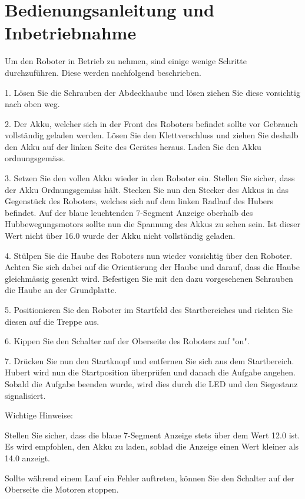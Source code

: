 \newpage

\section{Bedienungsanleitung und Inbetriebnahme}

Um den Roboter in Betrieb zu nehmen, sind einige wenige Schritte durchzuführen. Diese werden nachfolgend beschrieben.

1. Lösen Sie die Schrauben der Abdeckhaube und lösen ziehen Sie diese vorsichtig nach oben weg.

2. Der Akku, welcher sich in der Front des Roboters befindet sollte vor Gebrauch vollständig geladen werden. Lösen Sie den Klettverschluss und ziehen Sie deshalb den Akku auf der linken Seite des Gerätes heraus. Laden Sie den Akku ordnungsgemäss.

3. Setzen Sie den vollen Akku wieder in den Roboter ein. Stellen Sie sicher, dass der Akku Ordnungsgemäss hält. Stecken Sie nun den Stecker des Akkus in das Gegenstück des Roboters, welches sich auf dem linken Radlauf des Hubers befindet. Auf der blaue leuchtenden 7-Segment Anzeige oberhalb des Hubbewegungsmotors sollte nun die Spannung des Akkus zu sehen sein. Ist dieser Wert nicht über 16.0 wurde der Akku nicht vollständig geladen.

4. Stülpen Sie die Haube des Roboters nun wieder vorsichtig über den Roboter. Achten Sie sich dabei auf die Orientierung der Haube und darauf, dass die Haube gleichmässig gesenkt wird.
Befestigen Sie mit den dazu vorgesehenen Schrauben die Haube an der Grundplatte.

5. Positionieren Sie den Roboter im Startfeld des Startbereiches und richten Sie diesen auf die Treppe aus.

6. Kippen Sie den Schalter auf der Oberseite des Roboters auf "on".

7. Drücken Sie nun den Startknopf und entfernen Sie sich aus dem Startbereich. Hubert wird nun die Startposition überprüfen und danach die Aufgabe angehen. Sobald die Aufgabe beenden wurde, wird dies durch die LED und den Siegestanz signalisiert.

Wichtige Hinweise:

Stellen Sie sicher, dass die blaue 7-Segment Anzeige stets über dem Wert 12.0 ist. Es wird empfohlen, den Akku zu laden, soblad die Anzeige einen Wert kleiner als 14.0 anzeigt.

Sollte während einem Lauf ein Fehler auftreten, können Sie den Schalter auf der Oberseite die Motoren stoppen.






